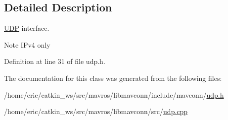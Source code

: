 \subsection{Detailed Description}
\mbox{\hyperlink{classUDP}{U\+DP}} interface. 

\begin{DoxyNote}{Note}
I\+Pv4 only 
\end{DoxyNote}


Definition at line 31 of file udp.\+h.



The documentation for this class was generated from the following files\+:\begin{DoxyCompactItemize}
\item 
/home/eric/catkin\+\_\+ws/src/mavros/libmavconn/include/mavconn/\mbox{\hyperlink{udp_8h}{udp.\+h}}\item 
/home/eric/catkin\+\_\+ws/src/mavros/libmavconn/src/\mbox{\hyperlink{udp_8cpp}{udp.\+cpp}}\end{DoxyCompactItemize}
